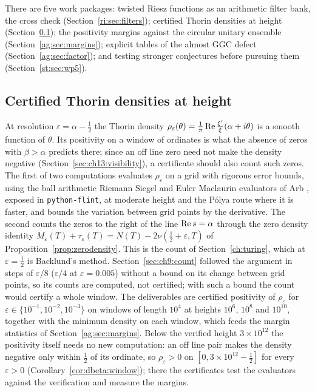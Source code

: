 There are five work packages: twisted Riesz functions as an arithmetic filter bank, the cross check (Section~\ref{ri:sec:filters}); certified Thorin densities at height (Section~\ref{st:sec:wp2}); the positivity margins against the circular unitary ensemble (Section~\ref{ag:sec:margins}); explicit tables of the almost GGC defect (Section~\ref{ag:sec:factor}); and testing stronger conjectures before pursuing them (Section~\ref{st:sec:wp5}).

\subsection{Certified Thorin densities at height}\label{st:sec:wp2}

At resolution $\varepsilon=\alpha-\frac12$ the Thorin density $\rho_\varepsilon(\theta)=\frac1\pi\operatorname{Re}\frac{\xi'}{\xi}(\alpha+i\theta)$ is a smooth function of $\theta$. Its positivity on a window of ordinates is what the absence of zeros with $\beta>\alpha$ predicts there; since an off line zero need not make the density negative (Section~\ref{sec:ch13:visibility}), a certificate should also count such zeros. The first of two computations evaluates $\rho_\varepsilon$ on a grid with rigorous error bounds, using the ball arithmetic Riemann Siegel and Euler Maclaurin evaluators of Arb \cite{Arb}, exposed in \texttt{python-flint}, at moderate height and the P\'olya route where it is faster, and bounds the variation between grid points by the derivative. The second counts the zeros to the right of the line $\operatorname{Re} s=\alpha$ through the zero density identity $M_\varepsilon(T)+\tau_\varepsilon(T)=N(T)-2\nu(\frac12+\varepsilon,T)$ of Proposition~\ref{prop:zerodensity}. This is the count of Section~\ref{ch:turing}, which at $\varepsilon=\frac12$ is Backlund's method. Section~\ref{sec:ch9:count} followed the argument in steps of $\varepsilon/8$ ($\varepsilon/4$ at $\varepsilon=0.005$) without a bound on its change between grid points, so its counts are computed, not certified; with such a bound the count would certify a whole window. The deliverables are certified positivity of $\rho_\varepsilon$ for $\varepsilon\in\{10^{-1},10^{-2},10^{-3}\}$ on windows of length $10^4$ at heights $10^6$, $10^8$ and $10^{10}$, together with the minimum density on each window, which feeds the margin statistics of Section~\ref{ag:sec:margins}. Below the verified height $3\times10^{12}$ the positivity itself needs no new computation: an off line pair makes the density negative only within $\frac12$ of its ordinate, so $\rho_\varepsilon>0$ on $[0,3\times10^{12}-\frac12]$ for every $\varepsilon>0$ (Corollary~\ref{cor:dbeta:window}); there the certificates test the evaluators against the verification and measure the margins.

